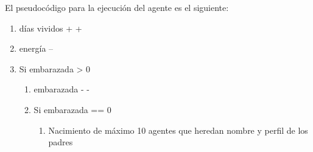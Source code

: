 El pseudocódigo para la ejecución del agente es el siguiente:

\begin{enumerate}
 \item días vividos + +
 \item energía --
 \item Si embarazada > 0
 \begin{enumerate}
  \item embarazada - -
  \item Si embarazada == 0
  \begin{enumerate}
   \item Nacimiento de máximo 10 agentes que heredan nombre y perfil de los
padres
  \end{enumerate}
 \end{enumerate}
 

\end{enumerate}
